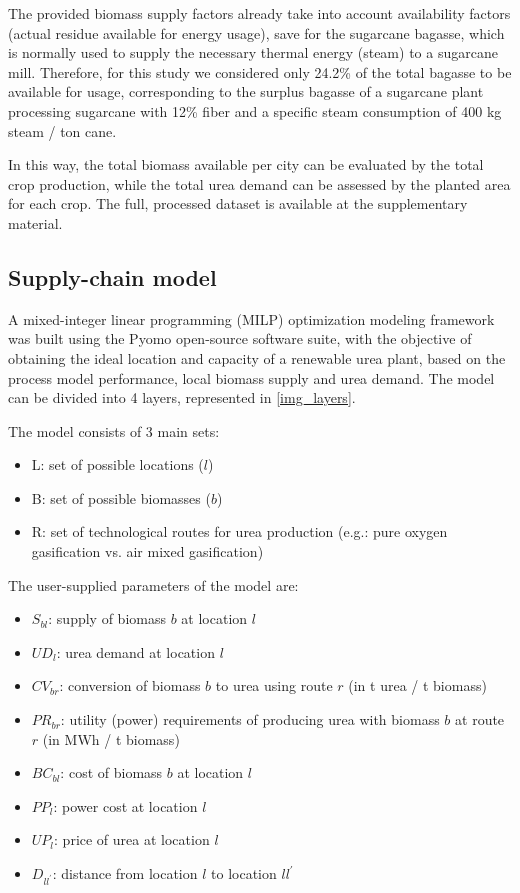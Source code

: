 \documentclass[a4paper, titlepage]{article}
\begin{document}
The provided biomass supply factors already take into account availability factors (actual residue available for energy
usage), save for the sugarcane bagasse, which is normally used to supply the necessary thermal energy (steam)
to a sugarcane mill. Therefore, for this study we considered only 24.2\% of the total bagasse to be available for
usage, corresponding to the surplus bagasse of a sugarcane plant processing sugarcane with 12\% fiber and a specific 
steam consumption of 400 kg steam / ton cane. 

In this way, the total biomass available per city can be evaluated by the total crop production, while the total urea
demand can be assessed by the planted area for each crop. The full, processed dataset is available at the supplementary
material.

\subsection{Supply-chain model}

A mixed-integer linear programming (MILP) optimization modeling framework was built using the Pyomo open-source
software suite, with the objective of obtaining the ideal location and capacity of a renewable urea plant,
based on the process model performance, local biomass supply and urea demand. The model can be divided into 4 layers,
represented in \autoref{img_layers}.

The model consists of 3 main sets:

\begin{itemize}
	\item L: set of possible locations ($l$)
	\item B: set of possible biomasses ($b$)
	\item R: set of technological routes for urea production (e.g.: pure oxygen gasification vs. air mixed gasification)
\end{itemize}

The user-supplied parameters of the model are:
\begin{itemize}
	\item $S_{bl}$: supply of biomass $b$ at location $l$
	\item $UD_l$: urea demand at location $l$
	\item $CV_{br}$: conversion of biomass $b$ to urea using route $r$ (in t urea / t biomass)
	\item $PR_{br}$: utility (power) requirements of producing urea with biomass $b$ at route $r$ (in MWh / t biomass)
	\item $BC_{bl}$: cost of biomass $b$ at location $l$
	\item $PP_l$: power cost at location $l$
	\item $UP_l$: price of urea at location $l$
	\item $D_{ll^{'}}$: distance from location $l$ to location $ll^{'}$
	
\end{itemize}
\end{document}

